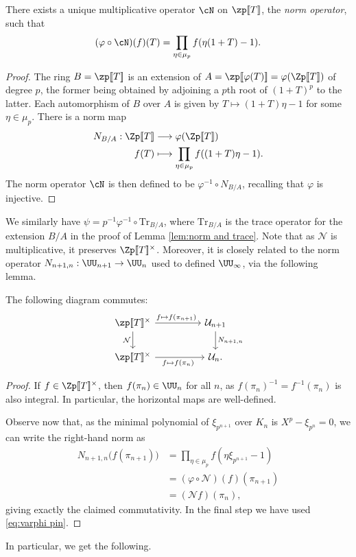 \documentclass[a4paper,10pt, english, reqno]{smfart}
\newcommand{\lsem}{[\! [}
\newcommand{\rsem}{]\! ]}
\numberwithin{equation}{section}
\begin{document}
\begin{lemma}\label{lem:norm and trace}
There exists a unique multiplicative operator $\cN$ on $\zp\lsem T\rsem$, the \emph{norm operator}, such that
\[
(\varphi\circ\cN)(f)(T) = \prod_{\eta \in \mu_p} f(\eta(1+T)-1).
\]
\end{lemma}

\begin{proof}
The ring $B = \zp\lsem T\rsem $ is an extension of $A = \zp\lsem \varphi(T)\rsem  = \varphi(\Zp\lsem T\rsem )$ of degree $p$, the former being obtained by adjoining a $p$th root of $(1 + T)^p$ to the latter. Each automorphism of $B$ over $A$ is given by $T \mapsto (1 + T) \eta - 1$ for some $\eta \in \mu_p$. There is a norm map 
\begin{align*}
N_{B/A}: \Zp\lsem T\rsem  &\longrightarrow \varphi(\Zp\lsem T\rsem )\\
f(T) &\longmapsto \prod_{\eta \in \mu_p} f((1 + T) \eta - 1).
\end{align*}
The norm operator $\cN$ is then defined to be $\varphi^{-1} \circ N_{B/A}$, recalling that $\varphi$ is injective.
\end{proof}

We similarly have $\psi = p^{-1}\varphi^{-1}\circ \mathrm{Tr}_{B/A}$, where $\mathrm{Tr}_{B/A}$ is the trace operator for the extension $B/A$ in the proof of Lemma \ref{lem:norm and trace}. Note that as $\mathcal{N}$ is multiplicative, it preserves $\Zp\lsem T\rsem^\times$. Moreover, it is closely related to the norm operator $N_{n+1,n} : \UU_{n+1} \to \UU_n$ used to defined $\UU_\infty$, via the following lemma.


\begin{lemma}\label{lem:norm power series vs units}
The following diagram commutes:
\begin{equation} \label{EqCommutDiagNorm}
\begin{tikzcd}
\zp\lsem T \rsem^\times \ar[rr, "{\ \ f \mapsto f(\pi_{n+1}) \ \ \ }"] \ar[d, "\mathcal{N}"'] & & \mathcal{U}_{n+1} \ar[d, "{N_{n+1, n}}"] \\
\zp\lsem T \rsem^\times \ar[rr, "{\ \ f \mapsto f(\pi_n)\ \ \ }"'] & & \mathcal{U}_n.
\end{tikzcd}
\end{equation}
\end{lemma}
\begin{proof}
If $f \in \Zp\lsem T \rsem^\times$, then $f(\pi_n) \in \UU_n$ for all $n$, as $f(\pi_n)^{-1} = f^{-1}(\pi_n)$ is also integral. In particular, the horizontal maps are well-defined. 

Observe now that, as the minimal polynomial of $\xi_{p^{n+1}}$ over $K_n$ is $X^p - \xi_{p^n} = 0$, we can write the right-hand norm as
\begin{align*}
N_{n+1,n}\big(f(\pi_{n+1})\big) &= \prod_{\eta \in \mu_p}f(\eta \xi_{p^{n+1}} - 1) \\
&= (\varphi \circ \mathcal{N})(f)(\pi_{n+1}) \\
&= (\mathcal{N}f) (\pi_{n}),
\end{align*}
giving exactly the claimed commutativity. In the final step we have used \eqref{eq:varphi pin}.
\end{proof}
In particular, we get the following.
\end{document}
